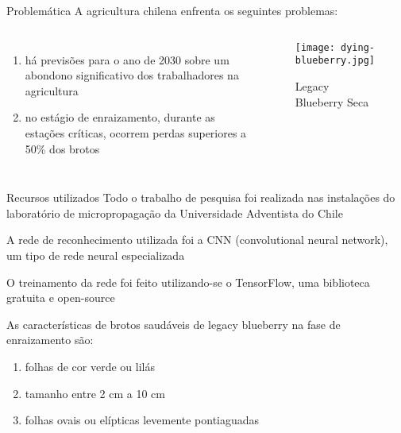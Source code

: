\begin{frame}[t]{Problemática} 
    \transdissolve[duration=0.5]
    A agricultura chilena enfrenta os seguintes problemas:
        \begin{columns}[t]
                \begin{enumerate}
                    \item há previsões para o ano de 2030 sobre um abondono significativo dos trabalhadores na agricultura
                    \item no estágio de enraizamento, durante as estações críticas, ocorrem perdas superiores a 50\% dos brotos
                \end{enumerate}
            \vspace{-0.5cm}
            \begin{center}
                \begin{figure}
                    \caption{Legacy Blueberry Seca}
                    \texttt{[image: dying-blueberry.jpg]}
                \end{figure}
            \end{center}
        \end{columns}
\end{frame}

\begin{frame}[t]{Recursos utilizados} 
    \newcommand\vspacerecursos{0.2cm}
    \transdissolve[duration=0.5]
    Todo o trabalho de pesquisa foi realizada nas instalações do laboratório de micropropagação da Universidade Adventista do Chile \vspace{\vspacerecursos} 
    
    A rede de reconhecimento utilizada foi a CNN (convolutional neural network), um tipo de rede neural especializada\vspace{\vspacerecursos} 

    O treinamento da rede foi feito utilizando-se o TensorFlow, uma biblioteca gratuita e open-source \vspace{\vspacerecursos} 

    As características de brotos saudáveis de legacy blueberry na fase de enraizamento são:
    \begin{enumerate}
        \item folhas de cor verde ou lilás
        \item tamanho entre 2 cm a 10 cm
        \item folhas ovais ou elípticas levemente pontiaguadas
    \end{enumerate}
\end{frame}

